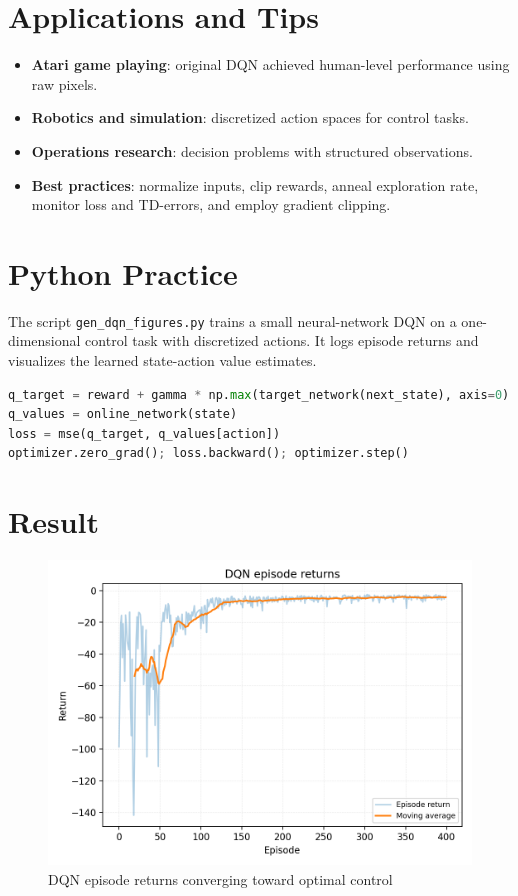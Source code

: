 ﻿\documentclass[12pt]{article}
\begin{document}
\section{Applications and Tips}
\begin{itemize}
  \item \textbf{Atari game playing}: original DQN achieved human-level performance using raw pixels.
  \item \textbf{Robotics and simulation}: discretized action spaces for control tasks.
  \item \textbf{Operations research}: decision problems with structured observations.
  \item \textbf{Best practices}: normalize inputs, clip rewards, anneal exploration rate, monitor loss and TD-errors, and employ gradient clipping.
\end{itemize}

\section{Python Practice}
The script \texttt{gen\_dqn\_figures.py} trains a small neural-network DQN on a one-dimensional control task with discretized actions. It logs episode returns and visualizes the learned state-action value estimates.
\begin{lstlisting}[language=Python,caption={Excerpt from gen_dqn_figures.py}]
q_target = reward + gamma * np.max(target_network(next_state), axis=0)
q_values = online_network(state)
loss = mse(q_target, q_values[action])
optimizer.zero_grad(); loss.backward(); optimizer.step()
\end{lstlisting}

\section{Result}
\begin{figure}[H]
  \centering
  \includegraphics[width=0.8\linewidth]{dqn_returns.png}
  \caption{DQN episode returns converging toward optimal control}
  \label{fig:dqn_returns}
\end{figure}
\end{document}
